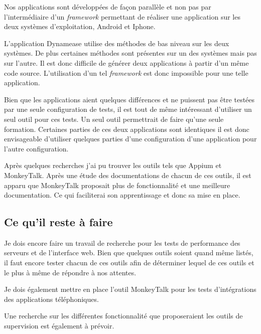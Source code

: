 Nos applications sont développées de façon parallèle et non pas par l'intermédiaire d'un \textit{framework} permettant de réaliser une application sur les deux systèmes d'exploitation, Android et Iphone. 

L'application Dynamease utilise des méthodes de bas niveau sur les deux systèmes. De plus certaines méthodes sont présentes sur un des systèmes mais pas sur l'autre. Il est donc difficile de générer deux applications à partir d'un même code source. L'utilisation d'un tel \textit{framework} est donc impossible pour une telle application.

Bien que les applications aient quelques différences et ne puissent pas être testées par une seule configuration de tests, il est tout de même intéressant d'utiliser un seul outil pour ces tests. Un seul outil permettrait de faire qu'une seule formation. Certaines parties de ces deux applications sont identiques il est donc envisageable d'utiliser quelques parties d'une configuration d'une application pour l'autre configuration.

Après quelques recherches j'ai pu trouver les outils tels que Appium et MonkeyTalk. Après une étude des documentations de chacun de ces outils, il est apparu que MonkeyTalk proposait plus de fonctionnalité et une meilleure documentation. Ce qui faciliterai son apprentissage et donc sa mise en place.


\subsection{Ce qu'il reste à faire}

Je dois encore faire un travail de recherche pour les tests de performance des serveurs et de l'interface web. Bien que quelques outils soient quand même listés, il faut encore tester chacun de ces outils afin de déterminer lequel de ces outils et le plus à même de répondre à nos attentes.

Je dois également mettre en place l'outil MonkeyTalk pour les tests d'intégrations des applications téléphoniques.

Une recherche sur les différentes fonctionnalité que proposeraient les outils de supervision est également à prévoir. 